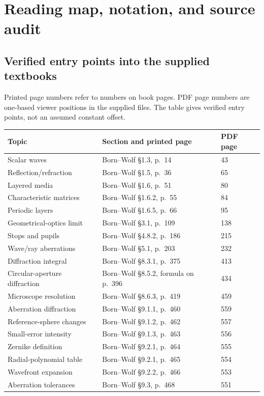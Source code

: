 \chapter{Reading map, notation, and source audit}\label{app:reading}
\section{Verified entry points into the supplied textbooks}
Printed page numbers refer to numbers on book pages.
PDF page numbers are one-based viewer positions in the supplied files.
The table gives verified entry points, not an assumed constant offset.

\begin{longtable}{@{}L{.27\textwidth}L{.44\textwidth}L{.20\textwidth}@{}}
\toprule Topic & Section and printed page & PDF page\\ \midrule\endhead
Scalar waves & Born--Wolf \S1.3, p.~14 &43\\
Reflection/refraction & Born--Wolf \S1.5, p.~36 &65\\
Layered media & Born--Wolf \S1.6, p.~51 &80\\
Characteristic matrices & Born--Wolf \S1.6.2, p.~55 &84\\
Periodic layers & Born--Wolf \S1.6.5, p.~66 &95\\
Geometrical-optics limit & Born--Wolf \S3.1, p.~109 &138\\
Stops and pupils & Born--Wolf \S4.8.2, p.~186 &215\\
Wave/ray aberrations & Born--Wolf \S5.1, p.~203 &232\\
Diffraction integral & Born--Wolf \S8.3.1, p.~375 &413\\
Circular-aperture diffraction & Born--Wolf \S8.5.2,
formula on p.~396 &434\\
Microscope resolution & Born--Wolf \S8.6.3, p.~419 &459\\
Aberration diffraction & Born--Wolf \S9.1.1, p.~460 &559\\
Reference-sphere changes & Born--Wolf \S9.1.2, p.~462 &557\\
Small-error intensity & Born--Wolf \S9.1.3, p.~463 &556\\
Zernike definition & Born--Wolf \S9.2.1, p.~464 &555\\
Radial-polynomial table & Born--Wolf \S9.2.1, p.~465 &554\\
Wavefront expansion & Born--Wolf \S9.2.2, p.~466 &553\\
Aberration tolerances & Born--Wolf \S9.3, p.~468 &551\\

\end{longtable}
